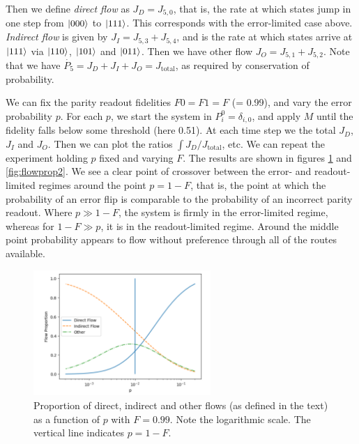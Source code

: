 \documentclass{report}
\begin{document}
Then we define \textit{direct flow} as $J_D = J_{5,0}$, that is, the rate at which states jump in one step from $\ket{000}$ to $\ket{111}$. This corresponds with the error-limited case above. \textit{Indirect flow} is given by $J_I = J_{5,3} + J_{5,4}$, and is the rate at which states arrive at $\ket{111}$ via $\ket{110}$, $\ket{101}$ and $\ket{011}$. Then we have other flow $J_O = J_{5,1} + J_{5,2}$. Note that we have $\dot{P_5} = J_D + J_I + J_O = J_\mathrm{total}$, as required by conservation of probability.

We can fix the parity readout fidelities $F0 = F1 = F$ (= 0.99), and vary the error probability $p$. For each $p$, we start the system in $P^0_i = \delta_{i,0}$, and apply $M$ until the fidelity falls below some threshold (here 0.51). At each time step we the total $J_D$, $J_I$ and $J_O$. Then we can plot the ratios $\int J_D/J_\mathrm{total}$, etc. We can repeat the experiment holding $p$ fixed and varying $F$. The results are shown in figures \ref{fig:flowprop1} and \ref{fig:flowprop2}. We see a clear point of crossover between the error- and readout-limited regimes around the point $p = 1-F$, that is, the point at which the probability of an error flip is comparable to the probability of an incorrect parity readout. Where $p \gg 1-F$, the system is firmly in the error-limited regime, whereas for $1-F \gg p$, it is in the readout-limited regime. Around the middle point probability appears to flow without preference through all of the routes available.
\begin{figure}[ht]
    \centering
        \centering
        \includegraphics[width=0.6\textwidth]{Figures/flow/f_fixed.png} %
        \caption{Proportion of direct, indirect and other flows (as defined in the text) as a function of $p$ with $F = 0.99$. Note the logarithmic scale. The vertical line indicates $p = 1-F$.}
        \label{fig:flowprop1}
\end{figure}
    
\end{document}
